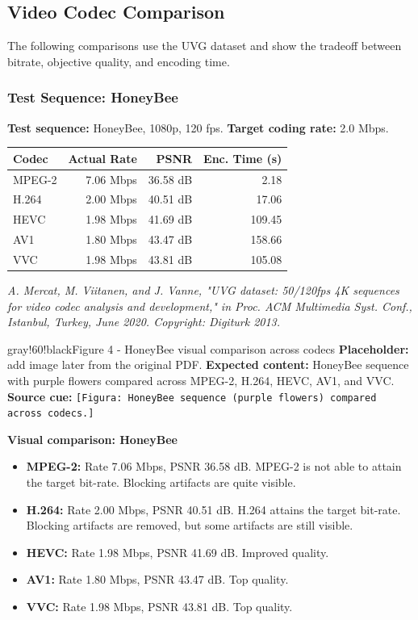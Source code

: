 \subsection{Video Codec Comparison}

The following comparisons use the UVG dataset and show the tradeoff between bitrate, objective quality, and encoding time.

\subsubsection{Test Sequence: HoneyBee}

\textbf{Test sequence:} HoneyBee, 1080p, 120 fps. \textbf{Target coding rate:} 2.0 Mbps.

\begin{center}
\begin{tabular}{|l|r|r|r|}
\hline
\textbf{Codec} & \textbf{Actual Rate} & \textbf{PSNR} & \textbf{Enc. Time (s)} \\ \hline
MPEG-2 & 7.06 Mbps & 36.58 dB & 2.18 \\ \hline
H.264 & 2.00 Mbps & 40.51 dB & 17.06 \\ \hline
HEVC & 1.98 Mbps & 41.69 dB & 109.45 \\ \hline
AV1 & 1.80 Mbps & 43.47 dB & 158.66 \\ \hline
VVC & 1.98 Mbps & 43.81 dB & 105.08 \\ \hline
\end{tabular}
\end{center}

\textit{A. Mercat, M. Viitanen, and J. Vanne, "UVG dataset: 50/120fps 4K sequences for video codec analysis and development," in Proc. ACM Multimedia Syst. Conf., Istanbul, Turkey, June 2020. Copyright: Digiturk 2013.}

\begin{calloutbox}{gray!60!black}{Figure 4 - HoneyBee visual comparison across codecs}
\textbf{Placeholder:} add image later from the original PDF. \textbf{Expected content:} HoneyBee sequence with purple flowers compared across MPEG-2, H.264, HEVC, AV1, and VVC. \textbf{Source cue:} \texttt{[Figura: HoneyBee sequence (purple flowers) compared across codecs.]}
\end{calloutbox}

\textbf{Visual comparison: HoneyBee}

\begin{itemize}
\item \textbf{MPEG-2:} Rate 7.06 Mbps, PSNR 36.58 dB. MPEG-2 is not able to attain the target bit-rate. Blocking artifacts are quite visible.
\item \textbf{H.264:} Rate 2.00 Mbps, PSNR 40.51 dB. H.264 attains the target bit-rate. Blocking artifacts are removed, but some artifacts are still visible.
\item \textbf{HEVC:} Rate 1.98 Mbps, PSNR 41.69 dB. Improved quality.
\item \textbf{AV1:} Rate 1.80 Mbps, PSNR 43.47 dB. Top quality.
\item \textbf{VVC:} Rate 1.98 Mbps, PSNR 43.81 dB. Top quality.
\end{itemize}

